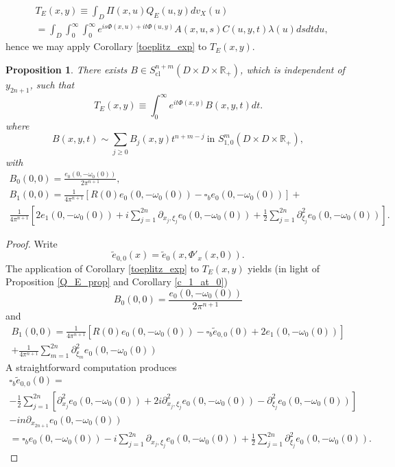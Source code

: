 \documentclass{article}
\newtheorem{proposition}[theorem]{Proposition}
\newcommand{\RR}{\mathbb R}
\DeclareMathOperator{\cl}{cl}
\begin{document}
\begin{equation}\label{T_E_prod} \begin{aligned} &T_E(x,y) \equiv \int_D \Pi(x,u) Q_E(u,y) dv_X(u)\\ &= \int_D \int_0^\infty \int_0^\infty  e^{i s \Phi(x,u) + i t \Phi(u,y)} A(x,u,s) C(u,y,t)\lambda(u) ds dt du,\end{aligned}\end{equation}
%
hence we may apply Corollary \ref{toeplitz_exp} to $T_E(x,y)$.
%
\begin{proposition} There exists $B \in S^{n+m}_{\cl}(D \times D \times \RR_+)$, which is independent of $y_{2n+1}$, such that $$T_E(x,y) \equiv \int_0^\infty e^{it \Phi(x, y)} B(x,y,t) dt.$$
where
%
$$B(x,y,t) \sim \sum_{j \ge 0} B_{j}(x,y) t^{n+m-j}\ \text{in } S^m_{1,0}(D \times D \times \RR_+),$$
%
with
%
\begin{multline*} B_{0}(0,0) = \frac{e_0(0, -\omega_0(0))}{2\pi^{n+1}},\\ B_{1}(0,0) = \frac 1 {4\pi^{n+1}} \left[R(0) e_0(0, -\omega_0(0))-\square_b e_0(0, -\omega_0(0))\right] +\\ \frac 1 {4\pi^{n+1}} \left[ 2 e_1(0, -\omega_0(0))+ i\sum_{j=1}^{2n} \partial_{x_j, \xi_j} e_0(0, -\omega_0(0)) + \frac 1 2 \sum_{j=1}^{2n} \partial^2_{\xi_j} e_0(0, -\omega_0(0))\right].  \end{multline*} \end{proposition}
%
\begin{proof}
%
Write
\begin{equation*} \tilde e_{0,0}(x) = \tilde e_0(x, \Phi'_x(x,0)).\end{equation*} The application of Corollary \ref{toeplitz_exp} to $T_E(x,y)$ yields (in light of Proposition \ref{Q_E_prop} and Corollary \ref{c_1_at_0})
\begin{equation*} B_{0}(0,0) = \frac{e_0(0, -\omega_0(0))}{2\pi^{n+1}}\end{equation*}
and
%
\begin{multline*}
B_{1}(0,0) = \frac 1 {4\pi^{n+1}} \left[R(0)e_0(0, -\omega_0(0))-\square_b \tilde e_{0,0}(0)+2e_1(0, -\omega_0(0))\right]\\ +\frac 1 {4\pi^{n+1}}\sum_{m=1}^{2n} \partial^2_{\xi_m} e_0(0, -\omega_0(0))\end{multline*}
A straightforward computation produces
\begin{multline*} \square_b \tilde e_{0,0}(0) = \\-\frac 1 2 \sum_{j=1}^{2n}\left[ \partial^2_{x_j} e_0(0, -\omega_0(0)) +2i \partial^2_{x_j, \xi_j}e_0(0, -\omega_0(0)) -\partial^2_{\xi_j} e_0(0, -\omega_0(0))\right] \\-in \partial_{x_{2n+1}} e_0(0, -\omega_0(0))\\ = \square_b e_0(0, -\omega_0(0)) -i\sum_{j=1}^{2n} \partial_{x_j, \xi_j} e_0(0, -\omega_0(0)) +\frac 1 2 \sum_{j=1}^{2n} \partial_{\xi_j}^2 e_0(0, -\omega_0(0)).\end{multline*}
%
\end{proof}
\end{document}

